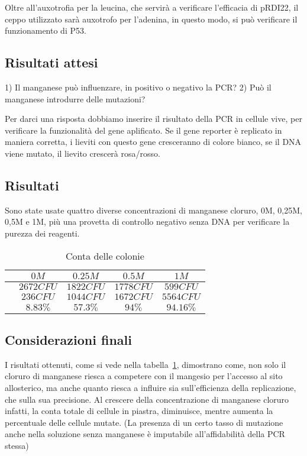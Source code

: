         Oltre all'auxotrofia per la leucina, che servirà a verificare l'efficacia di pRDI22, il ceppo utilizzato sarà auxotrofo per l'adenina, in questo modo, si può verificare
        il funzionamento di P53.

	\subsection*{Risultati attesi}

        1) Il manganese può influenzare, in positivo o negativo la PCR?
        2) Può il manganese introdurre delle mutazioni?

            Per darci una risposta dobbiamo inserire il risultato della PCR in cellule vive, per verificare la funzionalità del gene aplificato.
            Se il gene reporter è replicato in maniera corretta, i lieviti con questo gene cresceranno di colore bianco, se il DNA viene mutato, il lievito crescerà rosa/rosso.

   	\subsection*{Risultati}
        Sono state usate quattro diverse concentrazioni di manganese cloruro, 0M, 0,25M, 0,5M e 1M, più una provetta di controllo negativo senza DNA per verificare la
        purezza dei reagenti.
	\begin{table}[H]
		\centering
		\begin{tabular}{|c|c|c|c|c|}
			\hline
			\makecell{Concentrazione di \emph{$MnCl_2$}} & $0M$ & $0.25M$ & $0.5M$ & $1M$\\
			\hline
			\makecell{Conta totale} & $2672CFU$ & $1822CFU$ & $1778CFU$ & $599CFU$ \\
			\hline
			\makecell{Colonie mutate} & $236CFU$ & $1044CFU$ & $1672CFU$ & $5564CFU$\\
			\hline
			\makecell{Tasso di mutazione} & $8.83\%$ & $57.3\%$ & $94\%$ & $94.16\%$\\
			\hline
		\end{tabular}
		\caption{Conta delle colonie}
		\label{tab}
	\end{table}


	\subsection*{Considerazioni finali}
	I risultati ottenuti, come si vede nella tabella~\ref{tab}, dimostrano come, non solo il cloruro di manganese riesca a competere con il mangesio per l'accesso al sito allosterico,
        ma anche quanto riesca a influire sia sull'efficienza della replicazione, che sulla sua precisione.
        Al crescere della concentrazione di manganese cloruro infatti, la conta totale di cellule in piastra, diminuisce, mentre aumenta la percentuale delle cellule mutate.
        (La presenza di un certo tasso di mutazione anche nella soluzione senza manganese è imputabile all'affidabilità della PCR stessa)


